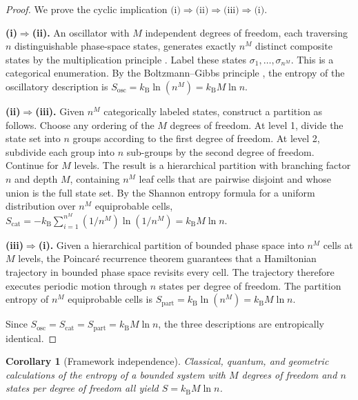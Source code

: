 \documentclass[10pt,twocolumn]{article}
\newtheorem{corollary}[theorem]{Corollary}
\theoremstyle{definition}
\theoremstyle{remark}
\newcommand{\kB}{k_{\mathrm{B}}}
\begin{document}
\begin{proof}
We prove the cyclic implication
$\text{(i)}\Rightarrow\text{(ii)}\Rightarrow\text{(iii)}\Rightarrow\text{(i)}$.

\medskip\noindent
\textbf{(i)$\Rightarrow$(ii).}
An oscillator with $M$ independent degrees of freedom, each
traversing $n$ distinguishable phase-space states, generates
exactly $n^M$ distinct composite states by the multiplication
principle \citep{Feller1968}.  Label these states
$\sigma_1,\dots,\sigma_{n^M}$.  This is a categorical
enumeration.  By the Boltzmann--Gibbs principle
\citep{Boltzmann1877,Gibbs1902}, the entropy of the
oscillatory description is
$S_{\mathrm{osc}}=\kB\ln(n^M)=\kB M\ln n$.

\medskip\noindent
\textbf{(ii)$\Rightarrow$(iii).}
Given $n^M$ categorically labeled states, construct a partition
as follows.  Choose any ordering of the $M$ degrees of freedom.
At level 1, divide the state set into $n$ groups according to
the first degree of freedom.  At level 2, subdivide each group
into $n$ sub-groups by the second degree of freedom.  Continue
for $M$ levels.  The result is a hierarchical partition with
branching factor $n$ and depth $M$, containing $n^M$ leaf cells
that are pairwise disjoint and whose union is the full state
set.  By the Shannon entropy formula \citep{Shannon1948} for a
uniform distribution over $n^M$ equiprobable cells,
$S_{\mathrm{cat}}=-\kB\sum_{i=1}^{n^M}(1/n^M)\ln(1/n^M)=\kB
M\ln n$.

\medskip\noindent
\textbf{(iii)$\Rightarrow$(i).}
Given a hierarchical partition of bounded phase space into
$n^M$ cells at $M$ levels, the Poincar\'e recurrence theorem
\citep{Poincare1890} guarantees that a Hamiltonian trajectory
in bounded phase space revisits every cell.  The trajectory
therefore executes periodic motion through $n$ states per
degree of freedom.  The partition entropy of $n^M$ equiprobable
cells is $S_{\mathrm{part}} = \kB \ln(n^M) = \kB M\ln n$.

\medskip\noindent
Since
$S_{\mathrm{osc}}=S_{\mathrm{cat}}=S_{\mathrm{part}}=\kB
M\ln n$, the three descriptions are entropically
identical.
\end{proof}

\begin{corollary}[Framework independence]\label{cor:framework}
Classical, quantum, and geometric calculations of the entropy
of a bounded system with $M$ degrees of freedom and $n$ states
per degree of freedom all yield $S=\kB M\ln n$.
\end{corollary}
\end{document}
